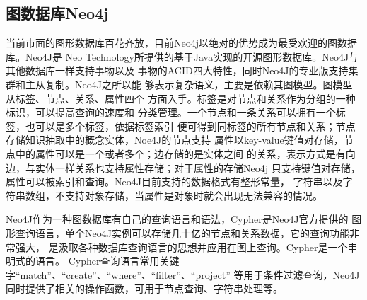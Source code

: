 \documentclass{standalone}
\begin{document}
\subsection{图数据库Neo4j}
当前市面的图形数据库百花齐放，目前Neo4j以绝对的优势成为最受欢迎的图数据库。Neo4J是
Neo Technology所提供的基于Java实现的开源图形数据库。Neo4J与其他数据库一样支持事物以及
事物的ACID四大特性，同时Neo4J的专业版支持集群和主从复制。Neo4J之所以能
够表示复杂语义，主要是依赖其图模型。图模型从标签、节点、关系、属性四个
方面入手。标签是对节点和关系作为分组的一种标识，可以提高查询的速度和
分类管理。一个节点和一条关系可以拥有一个标签，也可以是多个标签，依据标签索引
便可得到同标签的所有节点和关系；节点存储知识抽取中的概念实体，Noe4J的节点支持
属性以key-value键值对存储，节点中的属性可以是一个或者多个；边存储的是实体之间
的关系，表示方式是有向边，与实体一样关系也支持属性存储；对于属性的存储Neo4j
只支持键值对存储，属性可以被索引和查询。Neo4J目前支持的数据格式有整形常量，
字符串以及字符串数组，不支持对象存储，当属性是对象时就会出现无法兼容的情况。

Neo4J作为一种图数据库有自己的查询语言和语法，Cypher是Neo4J官方提供的
图形查询语言，单个Neo4J实例可以存储几十亿的节点和关系数据，它的查询功能非常强大，
是汲取各种数据库查询语言的思想并应用在图上查询。Cypher是一个申明式的语言。
Cypher查询语言常用关键字“match”、“create”、“where”、“filter”、“project”
等用于条件过滤查询，Neo4J同时提供了相关的操作函数，可用于节点查询、字符串处理等。
\end{document}
